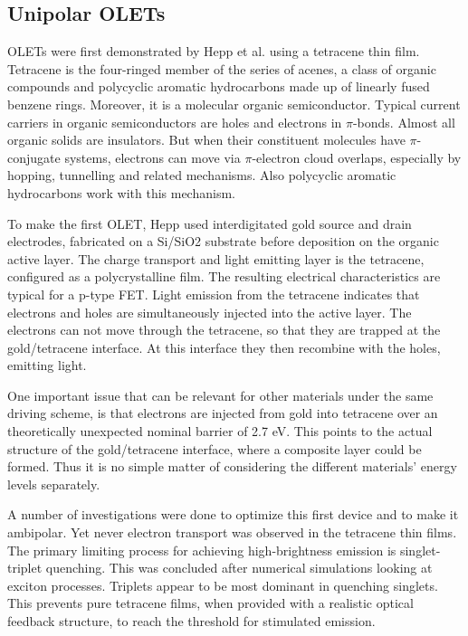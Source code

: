\subsection{Unipolar OLETs}\label{sec:ambipolar_olets} %

OLETs were first demonstrated by Hepp et al. using a tetracene thin film. Tetracene is the four-ringed member of the series of acenes, a class of organic compounds and polycyclic aromatic hydrocarbons made up of linearly fused benzene rings. Moreover, it is a molecular organic semiconductor. Typical current carriers in organic semiconductors are holes and electrons in $\pi$-bonds. Almost all organic solids are insulators. But when their constituent molecules have $\pi$-conjugate systems, electrons can move via $\pi$-electron cloud overlaps, especially by hopping, tunnelling and related mechanisms. Also polycyclic aromatic hydrocarbons work with this mechanism.

To make the first OLET, Hepp used interdigitated gold source and drain electrodes, fabricated on a Si/SiO2 substrate before deposition on the organic active layer. The charge transport and light emitting layer is the tetracene, configured as a polycrystalline film. The resulting electrical characteristics are typical for a p-type FET. Light emission from the tetracene indicates that electrons and holes are simultaneously injected into the active layer. The electrons can not move through the tetracene, so that they are trapped at the gold/tetracene interface. At this interface they then recombine with the holes, emitting light.

One important issue that can be relevant for other materials under the same driving scheme, is that electrons are injected from gold into tetracene over an theoretically unexpected nominal barrier of 2.7 eV. This points to the actual structure of the gold/tetracene interface, where a composite layer could be formed. Thus it is no simple matter of considering the different materials' energy levels separately. 

A number of investigations were done to optimize this first device and to make it ambipolar. Yet never electron transport was observed in the tetracene thin films. The primary limiting process for achieving high-brightness emission is singlet-triplet quenching. This was concluded after numerical simulations looking at exciton processes. Triplets appear to be most dominant in quenching singlets. This prevents pure tetracene films, when provided with a realistic optical feedback structure, to reach the threshold for stimulated emission.

